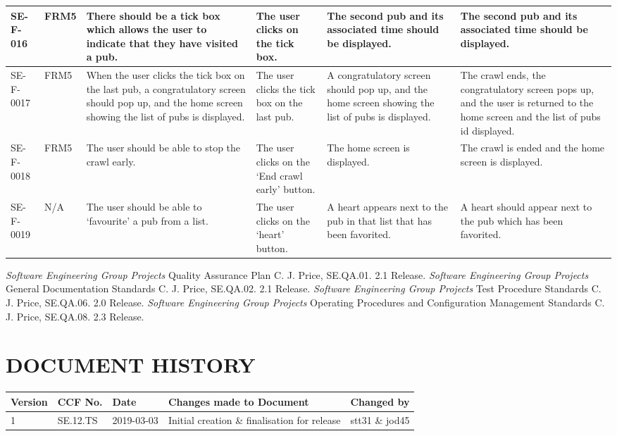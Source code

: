 \documentclass{project}
\begin{document}
\begin{center}
\begin{longtable}[c]{| p{1.6cm} | p{1cm} | p{3.5cm} |p{3.3cm} | p{3.3cm} | p{3.0cm} |}
 \hline
 SE-F-016 & FRM5 &There should be a tick box which allows the user to indicate that they have visited a pub. &The user clicks on the tick box. &The second pub and its associated time should be displayed.  &The second pub and its associated time should be displayed.  \\
 \hline
 SE-F-0017 & FRM5 &When the user clicks the tick box on the last pub, a congratulatory screen should pop up, and the home screen showing the list of pubs is displayed.  &The user clicks the tick box on the last pub.  &A congratulatory screen should pop up, and the home screen showing the list of pubs is displayed.  &The crawl ends, the congratulatory screen pops up, and the user is returned to the home screen and the list of pubs id displayed.  \\
 \hline
 SE-F-0018 & FRM5 & The user should be able to stop the crawl early. &The user clicks on the ‘End crawl early’ button.  &The home screen is displayed.  &The crawl is ended and the home screen is displayed.  \\
 \hline
 SE-F-0019 & N/A &The user should be able to ‘favourite’ a pub from a list.  &The user clicks on the ‘heart’ button.  &A heart appears next to the pub in that list that has been favorited.  &A heart should appear next to the pub which has been favorited.  \\
  \end{longtable}
 \end{center}
 \clearpage
 \begin{thebibliography}{5}
  \emph{Software Engineering Group Projects}
 Quality Assurance Plan
 C. J. Price, SE.QA.01. 2.1 Release.
  \emph{Software Engineering Group Projects}
 General Documentation Standards
 C. J. Price, SE.QA.02. 2.1 Release.
  \emph{Software Engineering Group Projects}
 Test Procedure Standards
 C. J. Price, SE.QA.06. 2.0 Release.
  \emph{Software Engineering Group Projects}
 Operating Procedures and Configuration Management Standards
 C. J. Price, SE.QA.08. 2.3 Release.
 \end{thebibliography}
 \section*{DOCUMENT HISTORY}
 \begin{tabular}{|l | l | l | l | l |}
 \hline
 Version & CCF No. & Date & Changes made to Document & Changed by \\
 \hline
 1 & SE.12.TS & 2019-03-03 & Initial creation \& finalisation for release & stt31 \& jod45\\
 \hline
 \end{tabular}
 \label{thelastpage}
 
\end{document}

